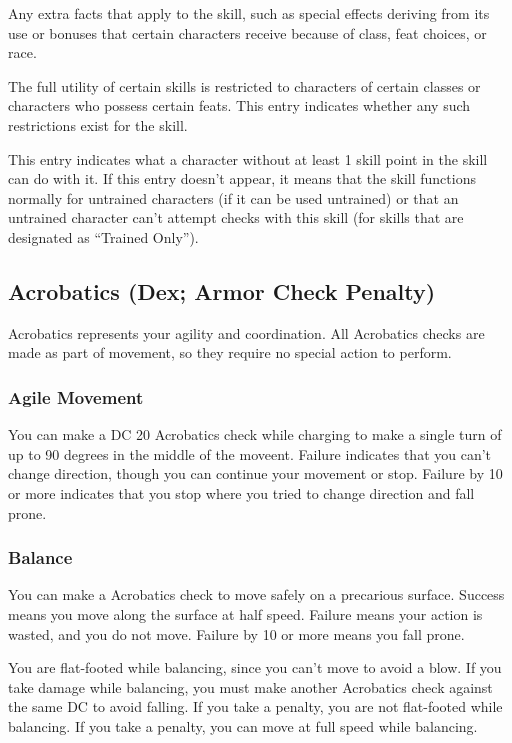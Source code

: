 Any extra facts that apply to the skill, such as special effects deriving from its use or bonuses that certain characters receive because of class, feat choices, or race.

 The full utility of certain skills is restricted to characters of certain classes or characters who possess certain feats. This entry indicates whether any such restrictions exist for the skill.

 This entry indicates what a character without at least 1 skill point in the skill can do with it. If this entry doesn't appear, it means that the skill functions normally for untrained characters (if it can be used untrained) or that an untrained character can't attempt checks with this skill (for skills that are designated as ``Trained Only'').

\subsection{Acrobatics (Dex; Armor Check Penalty)}
Acrobatics represents your agility and coordination. All Acrobatics checks are made as part of movement, so they require no special action to perform.

\subsubsection{Agile Movement}
You can make a DC 20 Acrobatics check while charging to make a single turn of up to 90 degrees in the middle of the moveent. Failure indicates that you can't change direction, though you can continue your movement or stop. Failure by 10 or more indicates that you stop where you tried to change direction and fall prone.

\subsubsection{Balance}
You can make a Acrobatics check to move safely on a precarious surface. Success means you move along the surface at half speed. Failure means your action is wasted, and you do not move. Failure by 10 or more means you fall prone.

You are flat-footed while balancing, since you can't move to avoid a blow. If you take damage while balancing, you must make another Acrobatics check against the same DC to avoid falling. If you take a  penalty, you are not flat-footed while balancing. If you take a  penalty, you can move at full speed while balancing.

